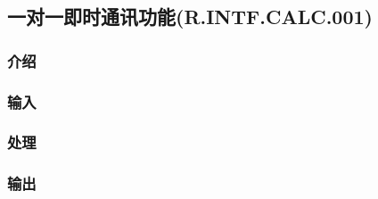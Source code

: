 \subsection{一对一即时通讯功能(R.INTF.CALC.001)}
\subsubsection{介绍}
\subsubsection{输入}
\subsubsection{处理}
\subsubsection{输出}